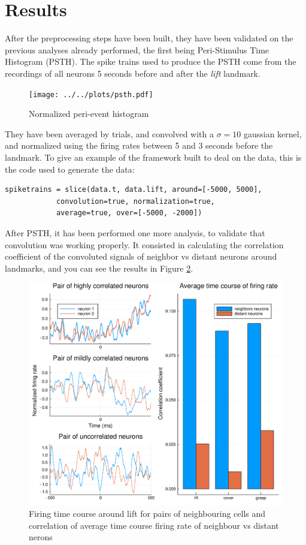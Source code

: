 \section{Results}

After the preprocessing steps have been built, they have been validated on the previous analyses already performed, the first being Peri-Stimulus Time Histogram (PSTH). The spike trains used to produce the PSTH come from the recordings of all neurons 5 seconds before and after the \emph{lift} landmark. 
\begin{figure}[h!]
	\centering
	\texttt{[image: ../../plots/psth.pdf]}
	\caption{Normalized peri-event histogram}
	\label{fig:psth}
\end{figure}
They have been averaged by trials, and convolved with a $\sigma=10$ gaussian kernel, and normalized using the firing rates between 5 and 3 seconds before the landmark. To give an example of the framework built to deal on the data, this is the code used to generate the data:
\begin{lstlisting}[frame=single]
spiketrains = slice(data.t, data.lift, around=[-5000, 5000], 
			convolution=true, normalization=true, 
			average=true, over=[-5000, -2000])
\end{lstlisting}


After PSTH, it has been performed one more analysis, to validate that convolution was working properly. It consisted in calculating the correlation coefficient of the convoluted signals of neighbor vs distant neurons around landmarks, and you can see the results in Figure \ref{fig:corr-coeff}.

\begin{figure}[h!]
	\centering
	\includegraphics[scale=0.5]{../../plots/corr-coef.pdf}
	\caption{Firing time course around lift for pairs of neighbouring cells and correlation of average time course firing rate of neighbour vs distant nerons}
	\label{fig:corr-coeff}
\end{figure}

